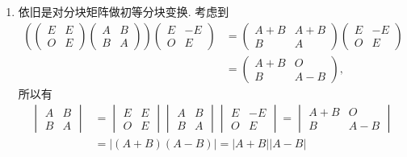 \begin{enumerate}
    \item 依旧是对分块矩阵做初等分块变换. 考虑到
          \begin{align*}
              \left(\begin{pmatrix}
                        E & E \\
                        O & E
                    \end{pmatrix}
              \begin{pmatrix}
                  A & B \\
                  B & A
              \end{pmatrix} \right)
              \begin{pmatrix}
                  E & -E \\
                  O & E
              \end{pmatrix}
               & = \begin{pmatrix}
                       A+B & A+B \\
                       B   & A
                   \end{pmatrix}
              \begin{pmatrix}
                  E & -E \\
                  O & E
              \end{pmatrix}      \\
               & = \begin{pmatrix}
                       A+B & O   \\
                       B   & A-B
                   \end{pmatrix},
          \end{align*}
          所以有 \begin{align*}
              \begin{vmatrix}
                  A & B \\
                  B & A
              \end{vmatrix}
               & = \begin{vmatrix}
                       E & E \\
                       O & E
                   \end{vmatrix}
              \begin{vmatrix}
                  A & B \\
                  B & A
              \end{vmatrix}
              \begin{vmatrix}
                  E & -E \\
                  O & E
              \end{vmatrix}
              = \begin{vmatrix}
                    A+B & O   \\
                    B   & A-B
                \end{vmatrix}    \\
               & =
              \lvert (A+B)(A-B) \rvert = \lvert A+B \rvert \lvert A-B \rvert
          \end{align*}


\end{enumerate}
